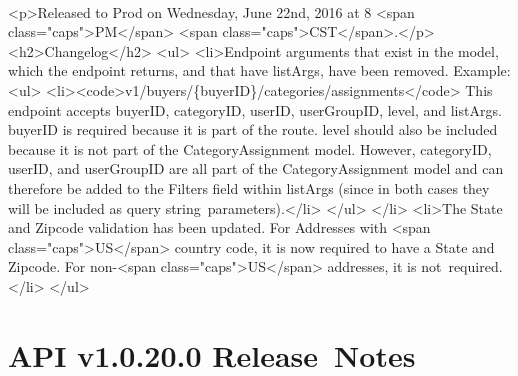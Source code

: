 \documentclass{memoir}%
\begin{document}
\paragraph*{}%
<p>Released to Prod on Wednesday, June 22nd, 2016 at 8 <span class="caps">PM</span> <span class="caps">CST</span>.</p>\newline%
<h2>Changelog</h2>\newline%
<ul>\newline%
<li>Endpoint arguments that exist in the model, which the endpoint returns, and that have listArgs, have been removed. Example:<ul>\newline%
<li><code>v1/buyers/\{buyerID\}/categories/assignments</code> This endpoint accepts buyerID, categoryID, userID, userGroupID, level, and listArgs. buyerID is required because it is part of the route. level should also be included because it is not part of the CategoryAssignment model. However, categoryID, userID, and userGroupID are all part of the CategoryAssignment model and can therefore be added to the Filters field within listArgs (since in both cases they will be included as query string~parameters).</li>\newline%
</ul>\newline%
</li>\newline%
<li>The State and Zipcode validation has been updated. For Addresses with <span class="caps">US</span> country code, it is now required to have a State and Zipcode. For non{-}<span class="caps">US</span> addresses, it is not~required.</li>\newline%
</ul>

%
\section*{API v1.0.20.0 Release~Notes}%
\paragraph*{}%

%
\end{document}
